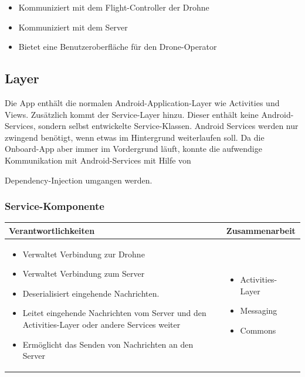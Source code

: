 \begin{itemize}
	\item Kommuniziert mit dem \Gls{Flight-Controller} der Drohne
	\item Kommuniziert mit dem Server
	\item Bietet eine Benutzeroberfläche für den Drone-Operator 
\end{itemize}

\subsection{Layer}

Die App enthält die normalen Android-Application-Layer wie Activities und Views. Zusätzlich kommt der Service-Layer hinzu. Dieser enthält keine Android-Services, sondern selbst entwickelte Service-Klassen. Android Services werden nur zwingend benötigt, wenn etwas im Hintergrund weiterlaufen soll. Da die Onboard-App aber immer im Vordergrund läuft, konnte die aufwendige Kommunikation mit Android-Services mit Hilfe von {Dependency-Injection \cite{DI} umgangen werden.\\

\subsubsection{Service-Komponente}

\begin{tabular}{|p{}|p{}|} \hline
	\textbf{Verantwortlichkeiten} & \textbf{Zusammenarbeit} \\ \hline \hline
	
	\begin{itemize}
		\item Verwaltet Verbindung zur Drohne
		\item Verwaltet Verbindung zum Server
		\item Deserialisiert eingehende Nachrichten.
		\item Leitet eingehende Nachrichten vom Server und den Activities-Layer oder andere Services weiter
		\item Ermöglicht das Senden von Nachrichten an den Server
	\end{itemize}&
	\begin{itemize}
		\item Activities-Layer
		\item Messaging
		\item Commons
	\end{itemize}
	\\ \hline
\end{tabular}


}
